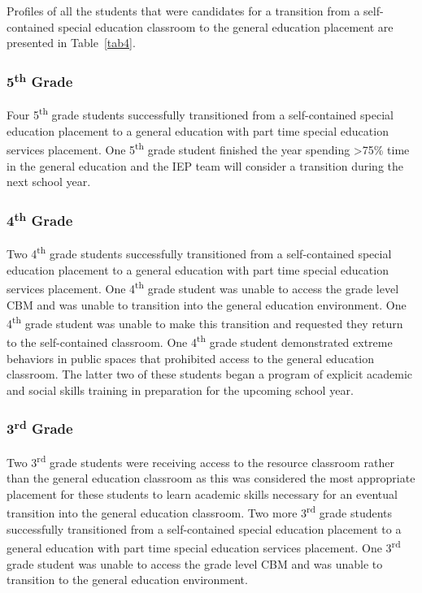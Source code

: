 \documentclass[twoside]{article}
\begin{document}
Profiles of all the students that were candidates for a transition from a self-contained special education classroom to the general education placement are presented in Table~\ref{tab4}.

\subsubsection{5\textsuperscript{th} Grade}
Four 5\textsuperscript{th} grade students successfully transitioned from a self-contained special education placement to a general education with part time special education services placement. One 5\textsuperscript{th} grade student finished the year spending \textgreater75\% time in the general education and the IEP team will consider a transition during the next school year.

\subsubsection{4\textsuperscript{th} Grade}
Two 4\textsuperscript{th} grade students successfully transitioned from a self-contained special education placement to a general education with part time special education services placement. One 4\textsuperscript{th} grade student was unable to access the grade level CBM and was unable to transition into the general education environment. One 4\textsuperscript{th} grade student was unable to make this transition and requested they return to the self-contained classroom. One 4\textsuperscript{th} grade student demonstrated extreme behaviors in public spaces that prohibited access to the general education classroom. The latter two of these students began a program of explicit academic and social skills training in preparation for the upcoming school year.

\subsubsection{3\textsuperscript{rd} Grade}
Two 3\textsuperscript{rd} grade students were receiving access to the resource classroom rather than the general education classroom as this was considered the most appropriate placement for these students to learn academic skills necessary for an eventual transition into the general education classroom. Two more 3\textsuperscript{rd} grade students successfully transitioned from a self-contained special education placement to a general education with part time special education services placement. One 3\textsuperscript{rd} grade student was unable to access the grade level CBM and was unable to transition to the general education environment.
\end{document}
